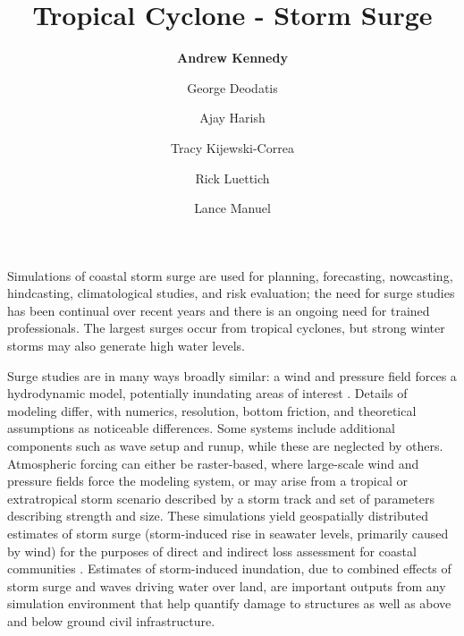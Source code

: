 %
%
%

\title{Tropical Cyclone - Storm Surge}
\author{
    \textbf{Andrew Kennedy}
    \and George Deodatis
    \and Ajay Harish
    \and Tracy Kijewski-Correa
    \and Rick Luettich
    \and Lance Manuel}
\tocauthor{}
%
%
\maketitle

Simulations of coastal storm surge are used for planning, forecasting, nowcasting, hindcasting, climatological studies, and risk evaluation; the need for surge studies has been continual over recent years and there is an ongoing need for trained professionals. The largest surges occur from tropical cyclones, but strong winter storms may also generate high water levels.

Surge studies are in many ways broadly similar: a wind and pressure field forces a hydrodynamic model, potentially inundating areas of interest \citep{njcoast2018implementation}. Details of modeling differ, with numerics, resolution, bottom friction, and theoretical assumptions as noticeable differences. Some systems include additional components such as wave setup and runup, while these are neglected by others. Atmospheric forcing can either be raster-based, where large-scale wind and pressure fields force the modeling system, or may arise from a tropical or extratropical storm scenario described by a storm track and set of parameters describing strength and size. These simulations yield geospatially distributed estimates of storm surge (storm-induced rise in seawater levels, primarily caused by wind) for the purposes of direct and indirect loss assessment for coastal communities \citep{jacob2011responding}. Estimates of storm-induced inundation, due to combined effects of storm surge and waves driving water over land, are important outputs from any simulation environment that help quantify damage to structures as well as above and below ground civil infrastructure.

